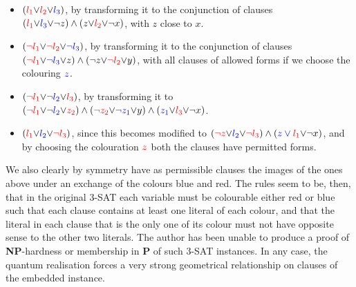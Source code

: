 \documentclass[reprint]{revtex4-1}
\theoremstyle{definition}
\begin{document}
\begin{itemize}
\item $(\color{red}{ l_1} \color{black}{\vee} \color{red}{l_2} \color{black}{\vee} \color{blue}{l_3}\color{black} )$, by transforming it to the conjunction of clauses $(\color{red}{l_1}  \color{black}{\vee} \color{blue}{l_3}\color{black}{\vee} \color{black}{\neg z})\wedge(\color{black}{z}\color{black}{\vee} \color{red}{l_2}\color{black}{\vee} \neg x)$, with $z$ close to $x$.

\item $(\color{red}{\neg l_1} \color{black}{\vee} \color{red}{\neg l_2} \color{black}{\vee} \color{blue}{\neg l_3}\color{black} )$, by transforming it to the conjunction of clauses $(\color{red}{\neg l_1}  \color{black}{\vee} \color{blue}{\neg l_3}\color{black}{\vee} \color{black}{z})\wedge(\color{black}{\neg z}\color{black}{\vee} \color{red}{\neg l_2}\color{black}{\vee} y)$, with all clauses of allowed forms if we choose the colouring $\color{blue}{z}$.

\item $(\color{red}{\neg l_1} \color{black}{\vee} \color{blue}{\neg l_2} \color{black}{\vee} \color{red}{l_3} \color{black})$, by transforming it to 
$(\color{red}{\neg l_1}  \color{black}{\vee}\color{blue}{\neg l_2}  \color{black}{\vee} \color{red}{z_2}   \color{black}) \wedge(\color{red}{\neg z_2}  \color{black}{\vee}  \color{blue}{\neg z_1} \color{black}{\vee}y)    \wedge    (\color{blue}{z_1} \color{black}{\vee}\color{red}{ l_3}  \color{black}{\vee} \neg x)$.

\item $(\color{red}{ l_1} \color{black}{\vee} \color{blue}{l_2} \color{black}{\vee} \color{red}{\neg l_3}\color{black} )$, since this becomes modified to 
$(\color{red}{\neg z} \color{black}{\vee} \color{blue}{ l_2} \color{black}{\vee} \color{red}{\neg l_3}\color{black})\wedge(\color{blue}{z} \vee \color{red}{ l_1}\color{black}{\vee} \neg x)$, and by choosing the colouration $\color{red}{z}$ both the clauses have permitted forms.
\end{itemize}
We also clearly by symmetry have as permissible clauses the images of the ones above under an exchange of the colours blue and red. The rules seem to be, then, that in the original \textsc{3-SAT} each variable must be colourable either red or blue such that each clause contains at least one literal of each colour, and that the literal in each clause that is the only one of its colour must not have opposite sense to the other two literals. %
The author has been unable to produce a proof of \textbf{NP}-hardness or membership in \textbf{P} of such \textsc{3-SAT} instances. In any case, the quantum realisation forces a very strong geometrical relationship on clauses of the embedded instance.
 
\end{document}
